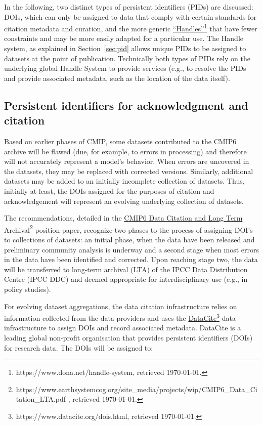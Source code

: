 \documentclass[gmd,manuscript]{copernicus}
\begin{document}
In the following, two distinct types of persistent identifiers (PIDs)
are discussed: DOIs, which can only be assigned to data that comply
with certain standards for citation metadata and curation, and the
more generic
\href{https://www.dona.net/handle-system}{``Handles''}\footnote{https://www.dona.net/handle-system,
  retrieved \today.} that have fewer constraints and may be more
easily adapted for a particular use. The Handle system, as explained
in Section~\ref{sec:pid} allows unique PIDs to be assigned to datasets
at the point of publication. Technically both types of PIDs rely on
the underlying global Handle System to provide services (e.g., to
resolve the PIDs and provide associated metadata, such as the location
of the data itself).

\subsection{Persistent identifiers for acknowledgment and citation}
\label{sec:doi}

Based on earlier phases of CMIP, some datasets contributed to the
CMIP6 archive will be flawed (due, for example, to errors in
processing) and therefore will not accurately represent a model's
behavior. When errors are uncovered in the datasets, they may be
replaced with corrected versions. Similarly, additional datasets may
be added to an initially incomplete collection of datasets. Thus,
initially at least, the DOIs assigned for the purposes of citation and
acknowledgement will represent an evolving underlying collection of
datasets.

The recommendations, detailed in the
\href{https://www.earthsystemcog.org/site_media/projects/wip/CMIP6_Data_Citation_LTA.pdf
}{CMIP6 Data Citation and Long Term
  Archival}\footnote{https://www.earthsystemcog.org/site\_media/projects/wip/CMIP6\_Data\_Citation\_LTA.pdf
  , retrieved \today.} position paper, recognize two phases to the
process of assigning DOI's to collections of datasets: an initial
phase, when the data have been released and preliminary community
analysis is underway and a second stage when most errors in the data
have been identified and corrected. Upon reaching stage two, the data
will be transferred to long-term archival (LTA) of the IPCC Data
Distribution Centre (IPCC DDC) and deemed appropriate for
interdisciplinary use (e.g., in policy studies).

For evolving dataset aggregations, the data citation infrastructure
relies on information collected from the data providers and uses the
\href{https://www.datacite.org/dois.html}{DataCite}\footnote{https://www.datacite.org/dois.html,
  retrieved \today.} data infrastructure to assign DOIs and record
associated metadata. DataCite is a leading global non-profit
organisation that provides persistent identifiers (DOIs) for research
data. The DOIs will be assigned to:
\end{document}
